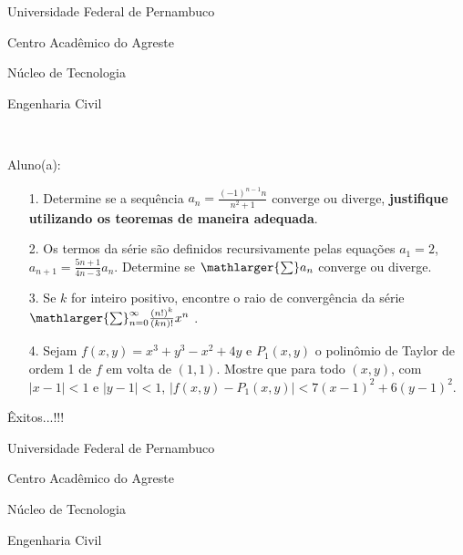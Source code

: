\documentclass[oneside,a4paper,12pt]{article}
\newcommand{\universidade}{Universidade Federal de Pernambuco}
\newcommand{\centro}{Centro Acadêmico do Agreste}
\newcommand{\departamento}{Núcleo de Tecnologia}
\newcommand{\curso}{Engenharia Civil}
\begin{document}
	\pagestyle{empty}
	
	\begin{center}
	 	\vspace{0pt}
	 	
		\universidade
		\par
		\centro
		\par
		\departamento
		\par
		\curso
		\par
		\vspace{08pt}
		\\
	\end{center}
	
	
	\begin{flushleft}
		Aluno(a):
	\end{flushleft}
	
\begin{itemize}
\item[1.] Determine se a sequência  $a_{n}=\frac{(-1)^{n-1}n}{n^{2}+1}$ converge ou diverge, \textbf{justifique utilizando os teoremas de maneira adequada}.
\end{itemize}
\begin{itemize}
\item[2.] Os termos da série são definidos recursivamente pelas equações
$a_{1}=2$, $a_{n+1}=\frac{5n+1}{4n-3}a_{n}$. Determine se $\mathlarger{\sum} a_{n}$ converge ou diverge. 
 \end{itemize}
 \begin{itemize}
\item [3.] Se $k$ for inteiro positivo, encontre o raio de convergência da série $\mathlarger{\sum}_{n=0}^{\infty}\frac{(n!)^{k}}{(kn)!}x^{n}$ .
\end{itemize}
\begin{itemize}
\item[4.] Sejam $f(x,y)=x^{3}+y^{3}-x^{2}+4y$ e $P_{1}(x,y)$ o polinômio de Taylor de ordem 1 de $f$ em volta de $(1,1)$. Mostre que para todo $(x,y)$, com $|x-1|<1$ e $|y-1|<1$, $\left|f(x,y)-P_{1}(x,y)\right|<7(x-1)^{2}+6(y-1)^{2}$.
\end{itemize}

	\flushbottom
	\flushright
     Êxitos...!!!
     \begin{center}
     	\vspace{50pt}
     	
     	\universidade
     	\par
     	\centro
     	\par
     	\departamento
     	\par
     	\curso
     	\par
     	\vspace{08pt}
     	\\
     \end{center}
     
\end{document}
